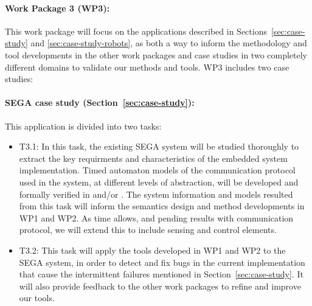 \paragraph{Work Package 3 (WP3):}  This work package will focus on the applications described in Sections~\ref{sec:case-study} and \ref{sec:case-study-robots}, as both a way to inform the methodology and tool developments in the other work packages and case studies in two completely different domains to validate our methods and tools.
WP3 includes two case studies:
\paragraph{SEGA case study (Section~\ref{sec:case-study}):} This application is divided into two tasks:
\noindent  \begin{itemize}[labelsep=3pt,leftmargin=12pt]
  \item T3.1: In this task, the existing SEGA system will be
    studied thoroughly to extract the key requirments and
    characteristics of the embedded system implementation.  Timed
    automaton models of the communication protocol used in the system,
    at different levels of abstraction, will be developed and formally
    verified in \uppaal and/or \prism. The system information and models
    resulted from this task will inform the semantics design and method
    developments in WP1 and WP2. As time allows, and pending results
    with communication protocol, we will extend this to include sensing
    and control elements.
  \item T3.2: This task will apply the tools developed in WP1 and WP2
    to the SEGA system, in order to detect and fix bugs in the current
    implementation that cause the intermittent failures mentioned in
    Section~\ref{sec:case-study}.  It will also provide feedback to
    the other work packages to refine and improve our tools.
  \end{itemize}

